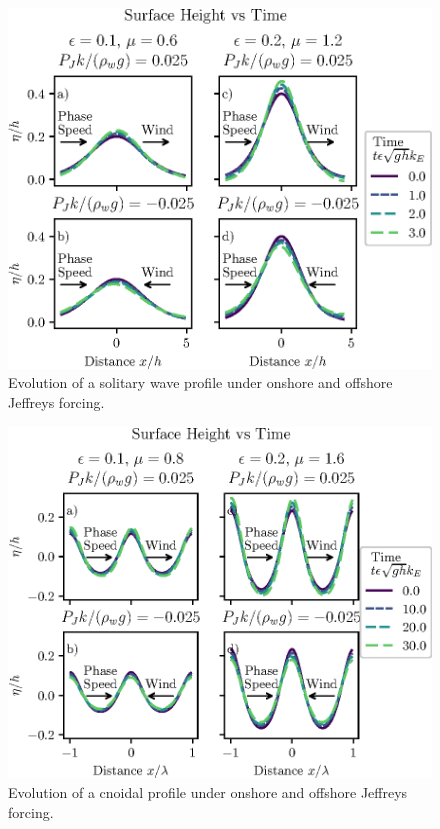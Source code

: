\documentclass{jfm}
\begin{document}
\begin{figure}
  \centering
  \includegraphics{Snapshots-Positive-Negative.eps}
  \caption{
    Evolution of a solitary wave profile under onshore and offshore Jeffreys
    forcing.
  }
\end{figure}

\begin{figure}
  \centering
  \includegraphics{Snapshots-Positive-Negative-Cnoidal.eps}
  \caption{
    Evolution of a cnoidal profile under onshore and offshore Jeffreys
    forcing.
  }
\end{figure}
\end{document}
